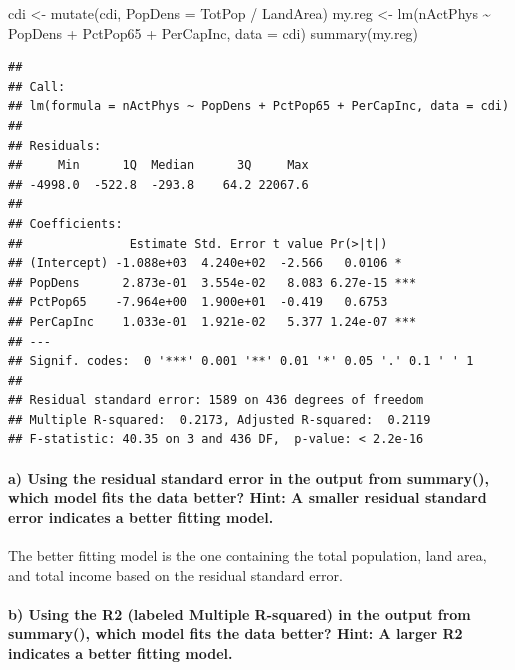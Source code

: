\documentclass[
]{article}
\newenvironment{Shaded}{\begin{snugshade}}{\end{snugshade}}
\newcommand{\AttributeTok}[1]{\textcolor[rgb]{0.77,0.63,0.00}{#1}}
\newcommand{\FunctionTok}[1]{\textcolor[rgb]{0.00,0.00,0.00}{#1}}
\newcommand{\NormalTok}[1]{#1}
\newcommand{\OtherTok}[1]{\textcolor[rgb]{0.56,0.35,0.01}{#1}}
\newcommand{\SpecialCharTok}[1]{\textcolor[rgb]{0.00,0.00,0.00}{#1}}
\begin{document}
\begin{Shaded}
\begin{Highlighting}[]
\NormalTok{cdi }\OtherTok{\textless{}{-}} \FunctionTok{mutate}\NormalTok{(cdi, }\AttributeTok{PopDens =}\NormalTok{ TotPop }\SpecialCharTok{/}\NormalTok{ LandArea)}
\NormalTok{my.reg }\OtherTok{\textless{}{-}} \FunctionTok{lm}\NormalTok{(nActPhys }\SpecialCharTok{\textasciitilde{}}\NormalTok{ PopDens }\SpecialCharTok{+}\NormalTok{ PctPop65 }\SpecialCharTok{+}\NormalTok{ PerCapInc, }\AttributeTok{data =}\NormalTok{ cdi)}
\FunctionTok{summary}\NormalTok{(my.reg)}
\end{Highlighting}
\end{Shaded}

\begin{verbatim}
## 
## Call:
## lm(formula = nActPhys ~ PopDens + PctPop65 + PerCapInc, data = cdi)
## 
## Residuals:
##     Min      1Q  Median      3Q     Max 
## -4998.0  -522.8  -293.8    64.2 22067.6 
## 
## Coefficients:
##               Estimate Std. Error t value Pr(>|t|)    
## (Intercept) -1.088e+03  4.240e+02  -2.566   0.0106 *  
## PopDens      2.873e-01  3.554e-02   8.083 6.27e-15 ***
## PctPop65    -7.964e+00  1.900e+01  -0.419   0.6753    
## PerCapInc    1.033e-01  1.921e-02   5.377 1.24e-07 ***
## ---
## Signif. codes:  0 '***' 0.001 '**' 0.01 '*' 0.05 '.' 0.1 ' ' 1
## 
## Residual standard error: 1589 on 436 degrees of freedom
## Multiple R-squared:  0.2173, Adjusted R-squared:  0.2119 
## F-statistic: 40.35 on 3 and 436 DF,  p-value: < 2.2e-16
\end{verbatim}

\hypertarget{a-using-the-residual-standard-error-in-the-output-from-summary-which-model-fits-the-data-better-hint-a-smaller-residual-standard-error-indicates-a-better-fitting-model.}{%
\paragraph{a) Using the residual standard error in the output from
summary(), which model fits the data better? Hint: A smaller residual
standard error indicates a better fitting
model.}\label{a-using-the-residual-standard-error-in-the-output-from-summary-which-model-fits-the-data-better-hint-a-smaller-residual-standard-error-indicates-a-better-fitting-model.}}

\hfill\break
The better fitting model is the one containing the total population,
land area, and total income based on the residual standard error.

\hypertarget{b-using-the-r2-labeled-multiple-r-squared-in-the-output-from-summary-which-model-fits-the-data-better-hint-a-larger-r2-indicates-a-better-fitting-model.}{%
\paragraph{b) Using the R2 (labeled Multiple R-squared) in the output
from summary(), which model fits the data better? Hint: A larger R2
indicates a better fitting
model.}\label{b-using-the-r2-labeled-multiple-r-squared-in-the-output-from-summary-which-model-fits-the-data-better-hint-a-larger-r2-indicates-a-better-fitting-model.}}
\end{document}
